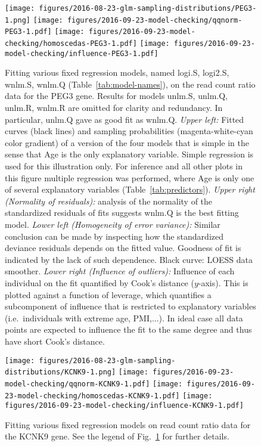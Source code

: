 \documentclass[letterpaper]{article}
\begin{document}
\begin{figure}[H]
\begin{center}
\texttt{[image: figures/2016-08-23-glm-sampling-distributions/PEG3-1.png]}
\texttt{[image: figures/2016-09-23-model-checking/qqnorm-PEG3-1.pdf]}
\texttt{[image: figures/2016-09-23-model-checking/homoscedas-PEG3-1.pdf]}
\texttt{[image: figures/2016-09-23-model-checking/influence-PEG3-1.pdf]}
\end{center}
\caption{
Fitting various fixed regression models, named logi.S, logi2.S, wnlm.S,
wnlm.Q (Table~\ref{tab:model-names}), on the read count ratio data for the
PEG3 gene.  Results for models unlm.S, unlm.Q, unlm.R, wnlm.R are omitted for
clarity and redundancy.  In particular, unlm.Q gave as good fit as wnlm.Q.
\emph{Upper left:}
Fitted curves (black lines) and sampling probabilities (magenta-white-cyan
color gradient) of a version of the four models that is simple in the sense
that Age is the
only explanatory variable.  Simple regression is used for this illustration
only.  For inference and all other plots in this figure multiple regression
was performed, where Age is only one of several explanatory variables (Table~\ref{tab:predictors}).
\emph{Upper right (Normality of residuals):} analysis of the normality of the standardized residuals of
fits suggests wnlm.Q is the best fitting model.
\emph{Lower left (Homogeneity of error variance):} Similar conclusion can be made by inspecting how the
standardized deviance residuals depends on the fitted value.  Goodness of fit
is indicated by the lack of such dependence.  Black curve: LOESS data smoother.
\emph{Lower right (Influence of outliers):} Influence of each individual on
the fit quantified by Cook's
distance (\(y\)-axis).  This is plotted against a function of leverage, which
quantifies a subcomponent of influence that is restricted to explanatory
variables (i.e.~individuals with extreme age, PMI,...). In ideal case all data points
are expected to influence the fit to the same degree and thus have short
Cook's distance.
}
\label{fig:fitting-fixed-PEG3}
\end{figure}

\begin{figure}[H]
\begin{center}
\texttt{[image: figures/2016-08-23-glm-sampling-distributions/KCNK9-1.png]}
\texttt{[image: figures/2016-09-23-model-checking/qqnorm-KCNK9-1.pdf]}
\texttt{[image: figures/2016-09-23-model-checking/homoscedas-KCNK9-1.pdf]}
\texttt{[image: figures/2016-09-23-model-checking/influence-KCNK9-1.pdf]}
\end{center}
\caption{
Fitting various fixed regression models on read count ratio data for the KCNK9
gene.  See the legend of Fig.~\ref{fig:fitting-fixed-PEG3} for further details.
}
\label{fig:fitting-fixed-KCNK9}
\end{figure}
\end{document}
